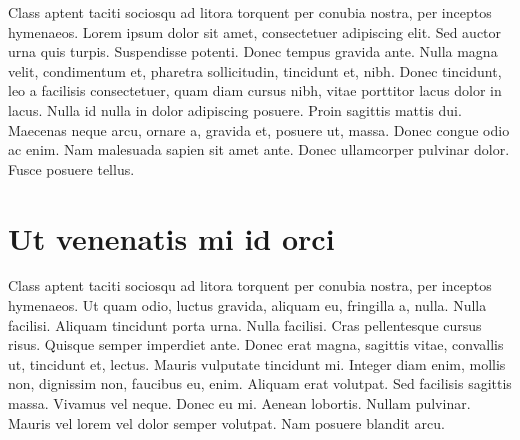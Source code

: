 Class aptent taciti sociosqu ad litora torquent per conubia nostra, per inceptos hymenaeos. Lorem ipsum dolor sit amet, consectetuer adipiscing elit. Sed auctor urna quis turpis. Suspendisse potenti. Donec tempus gravida ante. Nulla magna velit, condimentum et, pharetra sollicitudin, tincidunt et, nibh. Donec tincidunt, leo a facilisis consectetuer, quam diam cursus nibh, vitae porttitor lacus dolor in lacus. Nulla id nulla in dolor adipiscing posuere. Proin sagittis mattis dui. Maecenas neque arcu, ornare a, gravida et, posuere ut, massa. Donec congue odio ac enim. Nam malesuada sapien sit amet ante. Donec ullamcorper pulvinar dolor. Fusce posuere tellus.

\section{Ut venenatis mi id orci}

Class aptent taciti sociosqu ad litora torquent per conubia nostra, per inceptos hymenaeos. Ut quam odio, luctus gravida, aliquam eu, fringilla a, nulla. Nulla facilisi. Aliquam tincidunt porta urna. Nulla facilisi. Cras pellentesque cursus risus. Quisque semper imperdiet ante. Donec erat magna, sagittis vitae, convallis ut, tincidunt et, lectus. Mauris vulputate tincidunt mi. Integer diam enim, mollis non, dignissim non, faucibus eu, enim. Aliquam erat volutpat. Sed facilisis sagittis massa. Vivamus vel neque. Donec eu mi. Aenean lobortis. Nullam pulvinar. Mauris vel lorem vel dolor semper volutpat. Nam posuere blandit arcu.

\endinput 